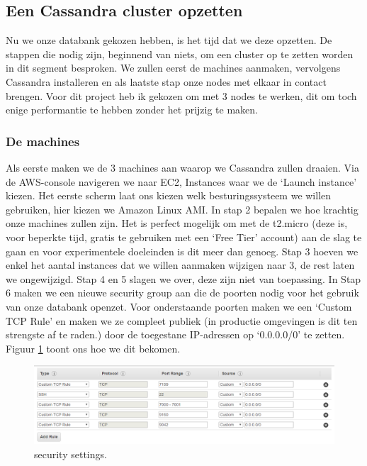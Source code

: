 \documentclass{article}
\begin{document}
	\subsection{Een Cassandra cluster opzetten}
	Nu we onze databank gekozen hebben, is het tijd dat we deze opzetten. 
	De stappen die nodig zijn, beginnend van niets, om een cluster op te zetten worden in dit segment besproken. 
	We zullen eerst de machines aanmaken, vervolgens Cassandra installeren en als laatste stap onze nodes met elkaar in contact brengen.
	Voor dit project heb ik gekozen om met 3 nodes te werken, dit om toch enige performantie te hebben zonder het prijzig te maken.
	\subsubsection{De machines}
	Als eerste maken we de 3 machines aan waarop we Cassandra zullen draaien. 
	Via de AWS-console navigeren we naar EC2, Instances waar we de ‘Launch instance’ kiezen.
	Het eerste scherm laat ons kiezen welk besturingssysteem we willen gebruiken, hier kiezen we Amazon Linux AMI. 
	In stap 2 bepalen we hoe krachtig onze machines zullen zijn. Het is perfect mogelijk om met de t2.micro 
	(deze is, voor beperkte tijd, gratis te gebruiken met een ‘Free Tier’ account) aan de slag te gaan en voor experimentele doeleinden is dit meer dan genoeg.
	Stap 3 hoeven we enkel het aantal instances dat we willen aanmaken wijzigen naar 3, 
	de rest laten we ongewijzigd. Stap 4 en 5 slagen we over, deze zijn niet van toepassing. 
	In Stap 6 maken we een nieuwe security group aan die de poorten nodig voor het gebruik van onze databank openzet. 
	Voor onderstaande poorten maken we een ‘Custom TCP Rule’ en maken we ze compleet publiek (in productie omgevingen is 
	dit ten strengste af te raden.) door de toegestane IP-adressen op ‘0.0.0.0/0’ te zetten. 	Figuur \ref{fig:security-settings} toont ons hoe we dit bekomen.
	
	
	
	\begin{figure}[h!]
  		\includegraphics[width=\linewidth]{images/inbound-rules-cassandra.PNG}
  		\caption{security settings.}
  		\label{fig:security-settings}
	\end{figure}
	
\end{document}
